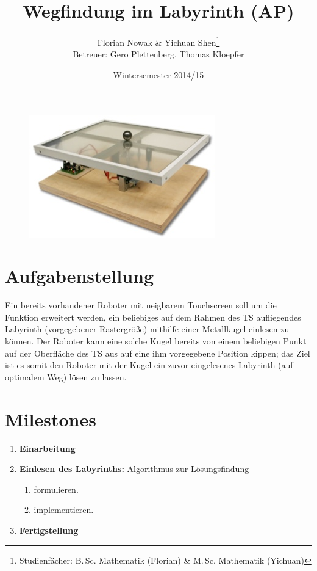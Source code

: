 \documentclass[ngerman]{scrartcl}
\title{Wegfindung im Labyrinth (AP)}
\author{
	Florian Nowak \& Yichuan Shen\footnote{Studienfächer: B.\,Sc. Mathematik (Florian) \&  M.\,Sc. Mathematik (Yichuan)}\\
	Betreuer: Gero Plettenberg, Thomas Kloepfer
	}
\date{Wintersemester 2014/15}
\begin{document}

\maketitle

\begin{figure}[h]
  \centering
  \includegraphics[scale=.5]{platzhalter}
\end{figure}

\section*{Aufgabenstellung}

Ein bereits vorhandener Roboter mit neigbarem Touchscreen soll um die Funktion erweitert werden, ein beliebiges auf dem Rahmen des TS aufliegendes Labyrinth (vorgegebener Rastergröße) mithilfe einer Metallkugel einlesen zu können. Der Roboter kann eine solche Kugel bereits von einem beliebigen Punkt auf der Oberfläche des TS aus auf eine ihm vorgegebene Position kippen; das Ziel ist es somit den Roboter mit der Kugel ein zuvor eingelesenes Labyrinth (auf optimalem Weg) lösen zu lassen.

\section*{Milestones}
\begin{enumerate}
  \item[\textbf{1.}] \textbf{Einarbeitung}
  \item[\textbf{2.}] \textbf{Einlesen des Labyrinths:} Algorithmus zur Lösungsfindung
    	\begin{enumerate}
  	\item[\textbf{a)}] formulieren.
  	\item[\textbf{b)}] implementieren.
  	\end{enumerate}
  \item[\textbf{3.}] \textbf{Fertigstellung}
\end{enumerate}
\end{document}
